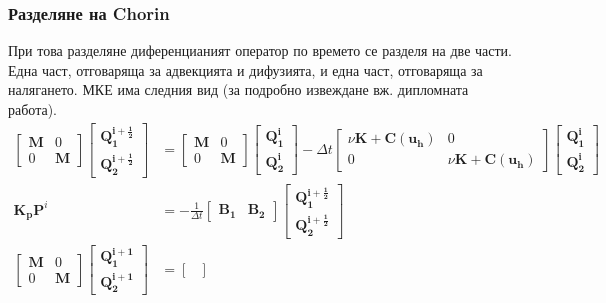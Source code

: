 \documentclass[12pt]{report}
\newcommand{\vecf}[1]{\mathbf{#1}}
\begin{document}
\subsubsection{Разделяне на Chorin}
При това разделяне диференцианият оператор по времето се разделя на две части. Една част, отговаряща за адвекцията и дифузията, и една част, отговаряща за налягането. МКЕ има следния вид (за подробно извеждане вж. дипломната работа).
\begin{equation}
\begin{aligned}
	\begin{bmatrix}
		\mathbf{M} & 0 \\
		0 & \mathbf{M}
	\end{bmatrix}
	\begin{bmatrix}
		\vecf{Q^{i + \frac{1}{2}}_1} \\
		\vecf{Q^{i + \frac{1}{2}}_2}
	\end{bmatrix} &=
	\begin{bmatrix}
		\mathbf{M} & 0 \\
		0 & \mathbf{M}
	\end{bmatrix}
	\begin{bmatrix}
		\vecf{Q^{i}_1} \\
		\vecf{Q^{i}_2}
	\end{bmatrix} - \Delta t \begin{bmatrix}
		\nu \mathbf{K} + \mathbf{C}(\vecf{u_h}) & 0 \\
		0 & \nu \mathbf{K} + \mathbf{C}(\vecf{u_h})
	\end{bmatrix} \begin{bmatrix}
		\vecf{Q^i_1} \\
		\vecf{Q^i_2}
	\end{bmatrix} \\
	\mathbf{K_p}\vecf{P}^i &= -\frac{1}{\Delta t} \begin{bmatrix}
		\mathbf{B_1} & \mathbf{B_2}
	\end{bmatrix} \begin{bmatrix}
		\vecf{Q^{i + \frac{1}{2}}_1} \\
		\vecf{Q^{i + \frac{1}{2}}_2}
	\end{bmatrix} \\
	\begin{bmatrix}
		\mathbf{M} & 0 \\
		0 & \mathbf{M}
	\end{bmatrix} \begin{bmatrix}
		\vecf{Q^{i+1}_1} \\
		\vecf{Q^{i+1}_2}
	\end{bmatrix} &=	\begin{bmatrix}

\end{bmatrix}
\end{aligned}
\end{equation}
\end{document}
